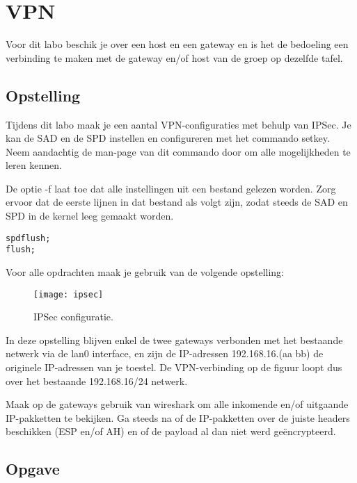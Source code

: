 \documentclass{report}
\begin{document}
\chapter{VPN}
Voor dit labo beschik je over een host en een gateway en is het de bedoeling een verbinding te maken met de gateway en/of host van de groep op dezelfde tafel. 
\section{Opstelling}
 Tijdens dit labo maak je een aantal VPN-configuraties met behulp van IPSec. Je kan de SAD en de SPD instellen en configureren met het commando setkey. Neem aandachtig de man-page van dit commando door om alle mogelijkheden te leren kennen.

De optie -f laat toe dat alle instellingen uit een bestand gelezen worden. Zorg ervoor dat de eerste lijnen in dat bestand als volgt zijn, zodat steeds de SAD en SPD in de kernel leeg gemaakt worden.
\begin{lstlisting}
spdflush;
flush;
\end{lstlisting}
Voor alle opdrachten maak je gebruik van de volgende opstelling:

\begin{figure}[h]
	\texttt{[image: ipsec]}
	\caption{IPSec configuratie.}
	\label{fig:ipsec}
\end{figure}

In deze opstelling blijven enkel de twee gateways verbonden met het bestaande netwerk via de lan0 interface, en zijn de IP-adressen 192.168.16.(aa bb) de originele IP-adressen van je toestel. De VPN-verbinding op de figuur loopt dus over het bestaande 192.168.16/24 netwerk.

Maak op de gateways gebruik van wireshark om alle inkomende en/of uitgaande IP-pakketten te bekijken. Ga steeds na of de IP-pakketten over de juiste headers beschikken (ESP en/of AH) en of de payload al dan niet werd geëncrypteerd. 

\section{Opgave}
\end{document}
